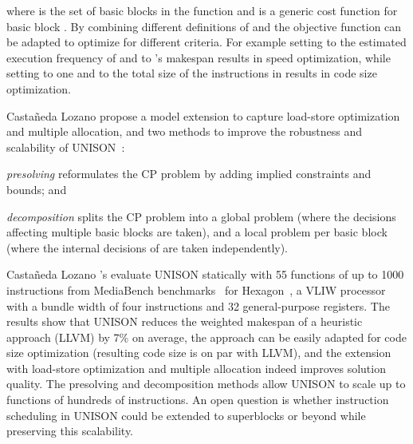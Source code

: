 \documentclass[acmsmall,authorversion,nonacm]{acmart}
\begin{document}
where  is the set of basic blocks in the function and
 is a generic cost function for basic block .
By combining different definitions of  and
 the objective function can be adapted to optimize for
different criteria.
For example setting  to the estimated execution
frequency of  and  to 's makespan results in
speed optimization, while setting  to one and
 to the total size of the instructions in  results
in code size optimization.

Casta\~{n}eda Lozano \etal{} propose a model extension to capture
load-store optimization and multiple allocation, and two methods to
improve the robustness and scalability of UNISON~\cite{Castaneda2014}:
\begin{inparaitem}[]
\item \emph{presolving} reformulates the CP problem by adding implied
  constraints and bounds; and
\item \emph{decomposition} splits the CP problem into a global problem
  (where the decisions affecting multiple basic blocks are taken), and
  a local problem per basic block  (where the internal decisions of
   are taken independently).
\end{inparaitem}

Casta\~{n}eda Lozano \etal{}'s evaluate UNISON statically with 55
functions of up to 1000 instructions from MediaBench
benchmarks~\cite{Lee1997} for Hexagon~\cite{Codrescu2014}, a VLIW
processor with a bundle width of four instructions and 32
general-purpose registers.
The results show that UNISON reduces the weighted makespan of a
heuristic approach (LLVM) by 7\% on average, the approach can be
easily adapted for code size optimization (resulting code size is on
par with LLVM), and the extension with load-store optimization and
multiple allocation indeed improves solution quality.
The presolving and decomposition methods allow UNISON to scale up to
functions of hundreds of instructions.
An open question is whether instruction scheduling in UNISON could be
extended to superblocks or beyond while preserving this scalability.
\end{document}
